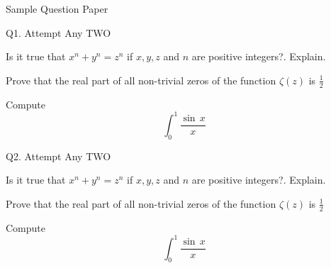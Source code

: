 \documentclass[12pt]{exam}
\begin{document}
\begin{center} Sample Question Paper 
\end{center}



\begin{flushleft} Q1. Attempt Any TWO \end{flushleft}



\begin{questions}
\question[3] Is it true that \(x^n + y^n = z^n\) if \(x,y,z\) and \(n\) are
positive integers?. Explain.
 
\question[4] Prove that the real part of all non-trivial zeros of the function
\(\zeta(z)\) is \(\frac{1}{2}\)
 
\question[4] Compute \[\int_{0}^{1} \frac{\sin\,x}{x}\]
\end{questions}

\begin{flushleft} Q2. Attempt Any TWO \end{flushleft}

\begin{questions}
\question[3] Is it true that \(x^n + y^n = z^n\) if \(x,y,z\) and \(n\) are
positive integers?. Explain.
 
\question[4] Prove that the real part of all non-trivial zeros of the function
\(\zeta(z)\) is \(\frac{1}{2}\)
 
\question[4] Compute \[\int_{0}^{1} \frac{\sin\,x}{x}\]
\end{questions}
\end{document}
